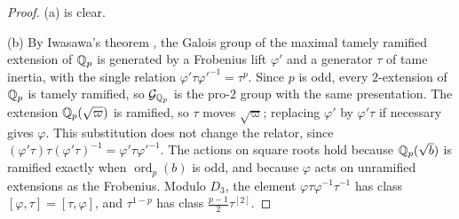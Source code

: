 \begin{proof}
(a) is clear.

(b) By Iwasawa's theorem \cite[Theorem~7.5.3]{NeukirchSchmidtWingberg2008},
the Galois group of the maximal tamely ramified extension of $\mathbb Q_p$ is
generated by a Frobenius lift $\varphi'$ and a generator $\tau$ of tame
inertia, with the single relation $\varphi'\tau\varphi'^{-1}=\tau^p$. Since
$p$ is odd,
every $2$-extension of $\mathbb Q_p$ is tamely ramified, so $\mathcal G_{\mathbb Q_p}$ is
the pro-$2$ group with the same presentation. The extension
$\mathbb Q_p(\sqrt\varpi)$ is ramified, so $\tau$ moves $\sqrt\varpi$; replacing
$\varphi'$ by $\varphi'\tau$ if necessary gives $\varphi$. This substitution
does not change the relator, since
$(\varphi'\tau)\tau(\varphi'\tau)^{-1}=\varphi'\tau\varphi'^{-1}$.
The actions on square roots hold because $\mathbb Q_p(\sqrt b)$ is ramified exactly
when $\operatorname{ord}_p(b)$ is odd, and because $\varphi$ acts on unramified extensions as
the Frobenius. Modulo $D_3$, the element $\varphi\tau\varphi^{-1}\tau^{-1}$
has class $[\varphi,\tau]=[\tau,\varphi]$, and $\tau^{1-p}$ has class
$\frac{p-1}2\tau^{[2]}$.


\end{proof}
